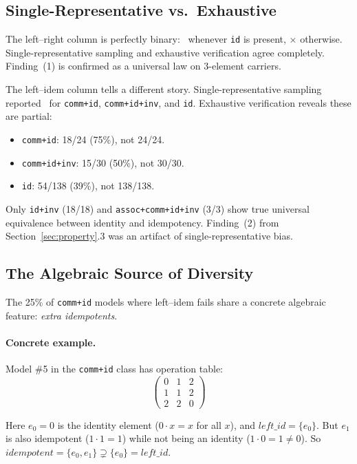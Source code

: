 \subsection{Single-Representative vs.\ Exhaustive}

The left--right column is perfectly binary: \checkmark\ whenever \texttt{id} is present, $\times$ otherwise. Single-representative sampling and exhaustive verification agree completely. Finding~(1) is confirmed as a universal law on 3-element carriers.

The left--idem column tells a different story. Single-representative sampling reported \checkmark\ for \texttt{comm+id}, \texttt{comm+id+inv}, and \texttt{id}. Exhaustive verification reveals these are partial:

\begin{itemize}
\item \texttt{comm+id}: 18/24 (75\%), not 24/24.
\item \texttt{comm+id+inv}: 15/30 (50\%), not 30/30.
\item \texttt{id}: 54/138 (39\%), not 138/138.
\end{itemize}

\noindent Only \texttt{id+inv} (18/18) and \texttt{assoc+comm+id+inv} (3/3) show true universal equivalence between identity and idempotency. Finding~(2) from Section~\ref{sec:property}.3 was an artifact of single-representative bias.

\subsection{The Algebraic Source of Diversity}

The 25\% of \texttt{comm+id} models where left--idem fails share a concrete algebraic feature: \emph{extra idempotents}.

\paragraph{Concrete example.} Model \#5 in the \texttt{comm+id} class has operation table:
\[
\begin{pmatrix} 0 & 1 & 2 \\ 1 & 1 & 2 \\ 2 & 2 & 0 \end{pmatrix}
\]

\noindent Here $e_0 = 0$ is the identity element ($0 \cdot x = x$ for all $x$), and $\mathit{left\_id} = \{e_0\}$. But $e_1$ is also idempotent ($1 \cdot 1 = 1$) while not being an identity ($1 \cdot 0 = 1 \neq 0$). So $\mathit{idempotent} = \{e_0, e_1\} \supsetneq \{e_0\} = \mathit{left\_id}$.

